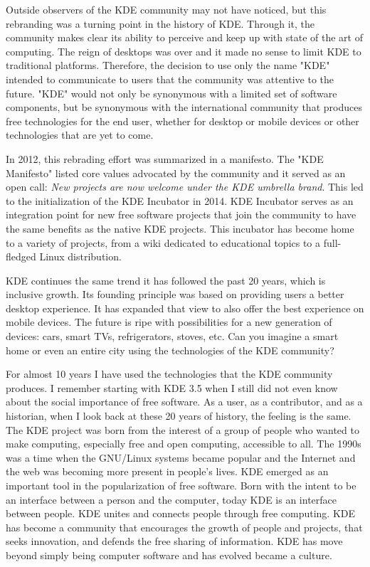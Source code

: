 Outside observers of the KDE community may not have noticed, but this rebranding was a turning point in the history of KDE. Through it, the community makes clear its ability to perceive and keep up with state of the art of computing. The reign of desktops was over and it made no sense to limit KDE to traditional platforms. Therefore, the decision to use only the name "KDE" intended to communicate to users that the community was attentive to the future. "KDE" would not only be synonymous with a limited set of software components, but be synonymous with the international community that produces free technologies for the end user, whether for desktop or mobile devices or other technologies that are yet to come. 

In 2012, this rebrading effort was summarized in a manifesto. The "KDE Manifesto" listed core values advocated by the community and it served as an open call: \textit{New projects are now welcome under the KDE umbrella brand}. This led to the initialization of the KDE Incubator in 2014. KDE Incubator serves as an integration point for new free software projects that join the community to have the same benefits as the native KDE projects. This incubator has become home to a variety of projects, from a wiki dedicated to educational topics to a full-fledged Linux distribution. 

KDE continues the same trend it has followed the past 20 years, which is inclusive growth. Its founding principle was based on providing users a better desktop experience. It has expanded that view to also offer the best experience on mobile devices. The future is ripe with possibilities for a new generation of devices: cars, smart TVs, refrigerators, stoves, etc. Can you imagine a smart home or even an entire city using the technologies of the KDE community? 

For almost 10 years I have used the technologies that the KDE community produces. I remember starting with KDE 3.5 when I still did not even know about the social importance of free software. As a user, as a contributor, and as a historian, when I look back at these 20 years of history, the feeling is the same. The KDE project was born from the interest of a group of people who wanted to make computing, especially free and open computing, accessible to all. The 1990s was a time when the GNU/Linux systems became popular and the Internet and the web was becoming more present in people's lives. KDE emerged as an important tool in the popularization of free software. Born with the intent to be an interface between a person and the computer, today KDE is an interface between people. KDE unites and connects people through free computing. KDE has become a community that encourages the growth of people and projects, that seeks innovation, and defends the free sharing of information. KDE has move beyond simply being computer software and has evolved became a culture.
